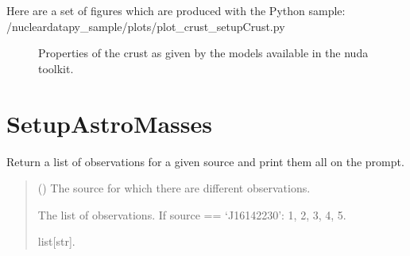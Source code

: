\documentclass[letterpaper,10pt,english]{sphinxmanual}
\begin{document}
\sphinxAtStartPar
Here are a set of figures which are produced with the Python sample: /nucleardatapy\_sample/plots/plot\_crust\_setupCrust.py

\begin{figure}[htbp]
\centering
\capstart

\noindent{}
\caption{Properties of the crust as given by the models available in the nuda toolkit.}\label{\detokenize{source/api/setup_crust:id1}}\end{figure}

\sphinxstepscope


\section{SetupAstroMasses}
\label{\detokenize{source/api/setup_astro_masses:setupastromasses}}\label{\detokenize{source/api/setup_astro_masses::doc}}\label{\detokenize{source/api/setup_astro_masses:module-nucleardatapy.astro.setup_masses}}

\begin{fulllineitems}
\label{\detokenize{source/api/setup_astro_masses:nucleardatapy.astro.setup_masses.masses_obss}}
\pysigstartsignatures
{}
\pysigstopsignatures
\sphinxAtStartPar
Return a list of observations for a given source and print them all on the prompt.
\begin{quote}\begin{description}
\sphinxAtStartPar
{} () \textendash{} The source for which there are different observations.

\sphinxAtStartPar
The list of observations.     If source == ‘J1614\textendash{}2230’: 1, 2, 3, 4, 5.

\sphinxAtStartPar
list{[}str{]}.

\end{description}\end{quote}

\end{fulllineitems}
\end{document}
